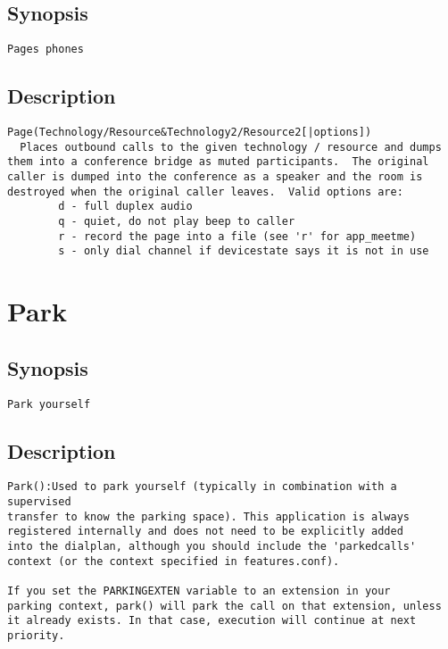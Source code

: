\subsection{Synopsis}
\begin{verbatim}
Pages phones
\end{verbatim}
\subsection{Description}
\begin{verbatim}
Page(Technology/Resource&Technology2/Resource2[|options])
  Places outbound calls to the given technology / resource and dumps
them into a conference bridge as muted participants.  The original
caller is dumped into the conference as a speaker and the room is
destroyed when the original caller leaves.  Valid options are:
        d - full duplex audio
        q - quiet, do not play beep to caller
        r - record the page into a file (see 'r' for app_meetme)
        s - only dial channel if devicestate says it is not in use

\end{verbatim}


\section{Park}
\subsection{Synopsis}
\begin{verbatim}
Park yourself
\end{verbatim}
\subsection{Description}
\begin{verbatim}
Park():Used to park yourself (typically in combination with a supervised
transfer to know the parking space). This application is always
registered internally and does not need to be explicitly added
into the dialplan, although you should include the 'parkedcalls'
context (or the context specified in features.conf).

If you set the PARKINGEXTEN variable to an extension in your
parking context, park() will park the call on that extension, unless
it already exists. In that case, execution will continue at next
priority.

\end{verbatim}


